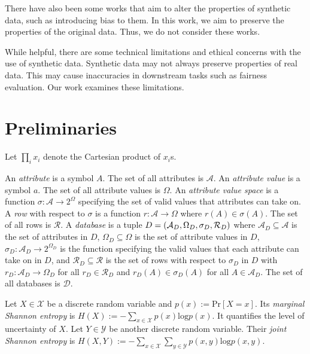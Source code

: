 \documentclass[manuscript,screen,review,anonymous]{acmart}
\DeclarePairedDelimiter{\tuple}{(}{)}
\renewcommand{\implies}{\rightarrow}
\newcommand{\db}{D}
\newcommand{\dbs}{\mathcal{D}}
\newcommand{\prob}[1]{\text{Pr}[#1]}
\newcommand{\entropy}[1]{H(#1)}
\begin{document}
There have also been some works that aim to alter the properties of synthetic data, such as introducing bias to them\cite{jiang2024synthetic,baumann2023bias}. In this work, we aim to preserve the properties of the original data. Thus, we do not consider these works.

While helpful, there are some technical limitations\cite{stadler2022synthetic,cheng2021can,ganev2022robin,wyllie2024fairness} and ethical concerns\cite{whitney2024real} with the use of synthetic data. Synthetic data may not always preserve properties of real data. This may cause inaccuracies in downstream tasks such as fairness evaluation. Our work examines these limitations.

\section{Preliminaries}
\label{sec:prelim}

Let $\prod_i x_i$ denote the Cartesian product of $x_i$s.

An \emph{attribute} is a symbol $A$.
The set of all attributes is $\mathcal{A}$.
An \emph{attribute value} is a symbol $a$.
The set of all attribute values is $\Omega$.
An \emph{attribute value space} is a function $\sigma : \mathcal{A} \implies 2^{\Omega}$
specifying the set of valid values that attributes can take on.
A \emph{row} with respect to $\sigma$
is a function $r : \mathcal{A} \implies \Omega$
where $r(A) \in \sigma(A)$.
The set of all rows is $\mathcal{R}$.
A \emph{database} is a tuple $\db =
\tuple{
    \mathcal{A}_{\db},
    \Omega_{\db},
    \sigma_{\db},
    \mathcal{R}_{\db}
}$
where
$\mathcal{A}_{\db} \subseteq \mathcal{A}$
is the set of attributes in $\db$,
$\Omega_{\db} \subseteq \Omega$
is the set of attribute values in $\db$,
$\sigma_{\db} : \mathcal{A}_{\db} \implies 2^{\Omega_{\db}}$
is the function specifying the valid values that each attribute can take on in $\db$,
and $\mathcal{R}_{\db} \subseteq \mathcal{R}$
is the set of rows with respect to $\sigma_{\db}$ in $\db$
with $r_\db : \mathcal{A}_\db \implies \Omega_\db$
for all $r_\db \in \mathcal{R}_\db$
and $r_\db(A) \in \sigma_\db(A)$
for all $A \in \mathcal{A}_\db$.
The set of all databases is $\dbs$.

Let $X \in \mathcal{X}$ be a discrete random variable and $p(x) := \prob{X = x}$. Its \emph{marginal Shannon entropy} is $\entropy{X} := -\sum_{x \in \mathcal{X}} p(x) \text{log} p(x)$. It quantifies the level of uncertainty of $X$. Let $Y \in \mathcal{Y}$ be another discrete random variable. Their \emph{joint Shannon entropy} is $\entropy{X,Y} := -\sum_{x \in \mathcal{X}} \sum_{y \in \mathcal{Y}} p(x, y) \text{log} p(x, y)$.
\end{document}
